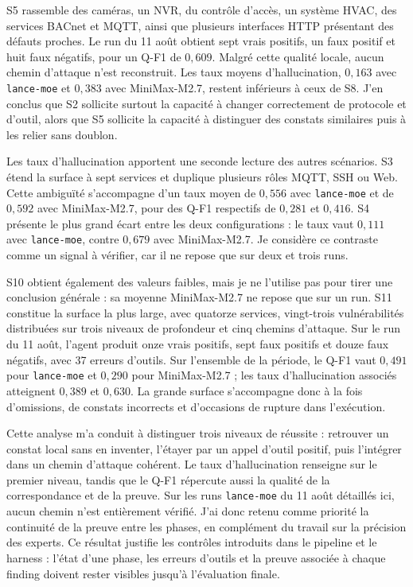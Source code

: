 S5 rassemble des caméras, un NVR, du contrôle d'accès, un système HVAC, des
services BACnet et MQTT, ainsi que plusieurs interfaces HTTP présentant des
défauts proches. Le run du 11 août obtient sept vrais positifs, un faux positif
et huit faux négatifs, pour un Q-F1 de \(0{,}609\). Malgré cette qualité locale,
aucun chemin d'attaque n'est reconstruit. Les taux moyens d'hallucination,
\(0{,}163\) avec \texttt{\footnotesize lance-moe} et \(0{,}383\) avec
MiniMax-M2.7, restent inférieurs à ceux de S8. J'en conclus que S2 sollicite
surtout la capacité à changer correctement de protocole et d'outil, alors que
S5 sollicite la capacité à distinguer des constats similaires puis à les relier
sans doublon.

Les taux d'hallucination apportent une seconde lecture des autres scénarios. S3
étend la surface à sept services et duplique plusieurs rôles MQTT, SSH ou Web.
Cette ambiguïté s'accompagne d'un taux moyen de \(0{,}556\) avec
\texttt{\footnotesize lance-moe} et de \(0{,}592\) avec MiniMax-M2.7, pour des
Q-F1 respectifs de \(0{,}281\) et \(0{,}416\). S4 présente le plus grand écart
entre les deux configurations : le taux vaut \(0{,}111\) avec
\texttt{\footnotesize lance-moe}, contre \(0{,}679\) avec MiniMax-M2.7. Je
considère ce contraste comme un signal à vérifier, car il ne repose que sur
deux et trois runs.

S10 obtient également des valeurs faibles, mais je ne l'utilise pas pour tirer
une conclusion générale : sa moyenne MiniMax-M2.7 ne repose que sur un run. S11
constitue la surface la plus large, avec quatorze services, vingt-trois
vulnérabilités distribuées sur trois niveaux de profondeur et cinq chemins
d'attaque. Sur le run du 11 août, l'agent produit onze vrais positifs, sept faux
positifs et douze faux négatifs, avec 37 erreurs d'outils. Sur l'ensemble de la
période, le Q-F1 vaut \(0{,}491\) pour \texttt{\footnotesize lance-moe} et
\(0{,}290\) pour MiniMax-M2.7 ; les taux d'hallucination associés atteignent
\(0{,}389\) et \(0{,}630\). La grande surface s'accompagne donc à la fois
d'omissions, de constats incorrects et d'occasions de rupture dans l'exécution.

Cette analyse m'a conduit à distinguer trois niveaux de réussite : retrouver un
constat local sans en inventer, l'étayer par un appel d'outil positif, puis
l'intégrer dans un chemin d'attaque cohérent. Le taux d'hallucination renseigne
sur le premier niveau, tandis que le Q-F1 répercute aussi la qualité de la
correspondance et de la preuve. Sur les runs \texttt{\footnotesize lance-moe}
du 11 août détaillés ici, aucun chemin n'est entièrement vérifié. J'ai donc
retenu comme priorité la continuité de la preuve entre les phases, en complément
du travail sur la précision des experts. Ce résultat justifie les contrôles
introduits dans le pipeline et le harness : l'état d'une phase, les erreurs
d'outils et la preuve associée à chaque finding doivent rester visibles jusqu'à
l'évaluation finale.

